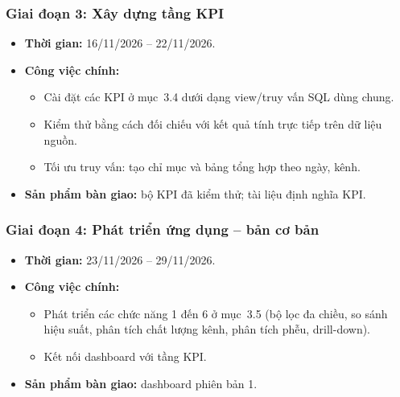 \subsubsection*{Giai đoạn 3: Xây dựng tầng KPI}
\begin{itemize}
    \item \textbf{Thời gian:} 16/11/2026 -- 22/11/2026.
    \item \textbf{Công việc chính:}
    \begin{itemize}
        \item Cài đặt các KPI ở mục~3.4 dưới dạng view/truy vấn SQL dùng chung.
        \item Kiểm thử bằng cách đối chiếu với kết quả tính trực tiếp trên dữ liệu
              nguồn.
        \item Tối ưu truy vấn: tạo chỉ mục và bảng tổng hợp theo ngày, kênh.
    \end{itemize}
    \item \textbf{Sản phẩm bàn giao:} bộ KPI đã kiểm thử; tài liệu định nghĩa KPI.
\end{itemize}

\subsubsection*{Giai đoạn 4: Phát triển ứng dụng -- bản cơ bản}
\begin{itemize}
    \item \textbf{Thời gian:} 23/11/2026 -- 29/11/2026.
    \item \textbf{Công việc chính:}
    \begin{itemize}
        \item Phát triển các chức năng 1 đến 6 ở mục~3.5 (bộ lọc đa chiều, so sánh
              hiệu suất, phân tích chất lượng kênh, phân tích phễu, drill-down).
        \item Kết nối dashboard với tầng KPI.
    \end{itemize}
    \item \textbf{Sản phẩm bàn giao:} dashboard phiên bản 1.
\end{itemize}

